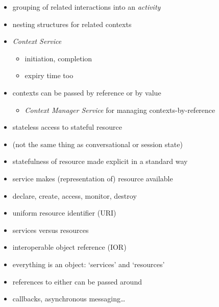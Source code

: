 \documentclass{sepslide-soa-faked} %
\begin{document}
\begin{slide}
\begin{itemize}
\item grouping of related interactions into an \emph{activity}
\item nesting structures for related contexts
\item \textit{Context Service}
\begin{itemize}
\item initiation, completion
\item expiry time too
\end{itemize}
\item contexts can be passed by reference or by value
\begin{itemize}
\item \textit{Context Manager Service} for managing contexts-by-reference
\end{itemize}
\end{itemize}
\end{slide}

\begin{slide}
\begin{itemize}
\item stateless access to stateful resource
\item (not the same thing as conversational or session state)
\item statefulness of resource made explicit in a standard way
\item service makes (representation of) resource available
\item declare, create, access, monitor, destroy
\end{itemize}
\end{slide}

\begin{slide}
\begin{itemize}
\item uniform resource identifier (URI)
\item services versus resources
\medskip
\item interoperable object reference (IOR)
\item everything is an object: `services' and `resources'
\item references to either can be passed around
\item callbacks, asynchronous messaging\ldots
\end{itemize}
\end{slide}
\end{document}
